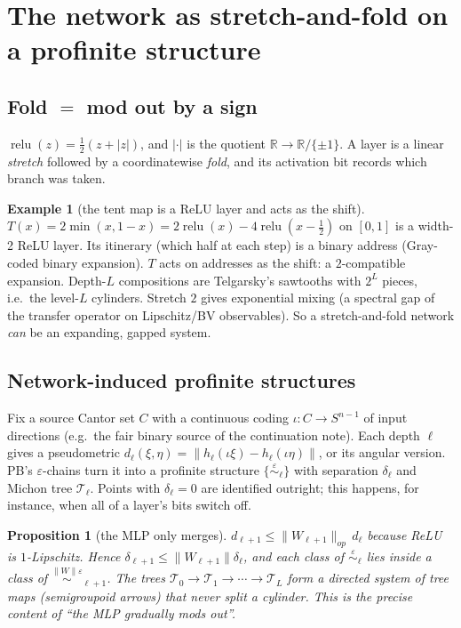 \documentclass[11pt]{article}
\newtheorem{proposition}[theorem]{Proposition}
\theoremstyle{definition}
\newtheorem{example}[theorem]{Example}
\theoremstyle{remark}
\newcommand{\R}{\mathbb R}
\newcommand{\relu}{\operatorname{relu}}
\begin{document}
\section{The network as stretch-and-fold on a profinite structure}

\subsection{Fold $=$ mod out by a sign}
$\relu(z)=\frac12(z+|z|)$, and $|\cdot|$ is the quotient $\R\to\R/\{\pm1\}$. A layer is a linear \emph{stretch} followed by a coordinatewise \emph{fold}, and its activation bit records which branch was taken.

\begin{example}[the tent map is a ReLU layer and acts as the shift]
$T(x)=2\min(x,1-x)=2\relu(x)-4\relu(x-\frac12)$ on $[0,1]$ is a width-2 ReLU layer. Its itinerary (which half at each step) is a binary address (Gray-coded binary expansion). $T$ acts on addresses as the shift: a $2$-compatible expansion. Depth-$L$ compositions are Telgarsky's sawtooths with $2^L$ pieces, i.e.\ the level-$L$ cylinders. Stretch $2$ gives exponential mixing (a spectral gap of the transfer operator on Lipschitz/BV observables). So a stretch-and-fold network \emph{can} be an expanding, gapped system.
\end{example}

\subsection{Network-induced profinite structures}
Fix a source Cantor set $C$ with a continuous coding $\iota:C\to S^{n-1}$ of input directions (e.g.\ the fair binary source of the continuation note). Each depth $\ell$ gives a pseudometric $d_\ell(\xi,\eta)=\|h_\ell(\iota\xi)-h_\ell(\iota\eta)\|$, or its angular version. PB's $\varepsilon$-chains turn it into a profinite structure $\{\overset{\varepsilon}{\sim}_\ell\}$ with separation $\delta_\ell$ and Michon tree $\mathcal T_\ell$. Points with $\delta_\ell=0$ are identified outright; this happens, for instance, when all of a layer's bits switch off.

\begin{proposition}[the MLP only merges]\label{prop:merge}
$d_{\ell+1}\le\|W_{\ell+1}\|_{op}\,d_\ell$ because ReLU is $1$-Lipschitz. Hence $\delta_{\ell+1}\le\|W_{\ell+1}\|\delta_\ell$, and each class of $\overset{\varepsilon}{\sim}_\ell$ lies inside a class of $\overset{\|W\|\varepsilon}{\sim}_{\ell+1}$. The trees $\mathcal T_0\to\mathcal T_1\to\cdots\to\mathcal T_L$ form a directed system of tree maps (semigroupoid arrows) that never split a cylinder. This is the precise content of ``the MLP gradually mods out''.
\end{proposition}
\end{document}
